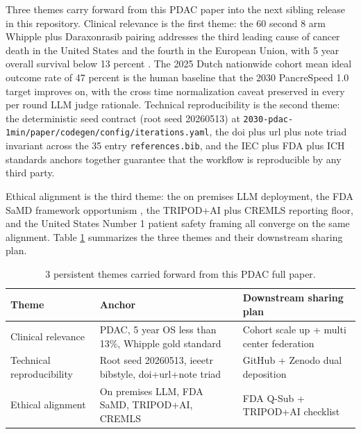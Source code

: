 Three themes carry forward from this PDAC paper into the next
sibling release in this repository. Clinical relevance is the
first theme: the 60 second 8 arm Whipple plus Daraxonrasib pairing
addresses the third leading cause of cancer death in the United
States and the fourth in the European Union, with 5 year overall
survival below 13 percent \cite{Siegel2025CancerStatistics}. The
2025 Dutch nationwide cohort mean ideal outcome rate of 47 percent
\cite{DutchCohort2025Whipple} is the human baseline that the 2030
PancreSpeed 1.0 target improves on, with the cross time
normalization caveat preserved in every per round LLM judge
rationale. Technical reproducibility is the second theme: the
deterministic seed contract (root seed 20260513) at
\texttt{2030-pdac-1min/paper/codegen/config/iterations.yaml}, the
doi plus url plus note triad invariant across the 35 entry
\texttt{references.bib}, and the IEC \cite{iec-80601-2-77,
iec-62304} plus FDA \cite{fda-samd, cfr-21-50-30, rev-fda-breakthrough}
plus ICH \cite{ich-e6r3} standards anchors together guarantee that
the workflow is reproducible by any third party.

Ethical alignment is the third theme: the on premises LLM
deployment, the FDA
SaMD framework opportunism \cite{fda-samd}, the TRIPOD+AI
\cite{Collins2024TRIPODAI} plus CREMLS \cite{ElEmam2024CREMLS}
reporting floor, and the United States Number 1 patient safety
framing all converge on the same alignment. Table
\ref{tab:conclusions-themes} summarizes the three themes and
their downstream sharing plan.

\clearpage

\begin{table}[H]
\caption{3 persistent themes carried forward from this PDAC full paper.}
\label{tab:conclusions-themes}
\centering
\begin{tabular}{>{\raggedright\arraybackslash}p{3.4cm} >{\raggedright\arraybackslash}p{5.5cm} >{\raggedright\arraybackslash}p{6.3cm}}
\toprule
\textbf{Theme} & \textbf{Anchor} & \textbf{Downstream sharing plan} \\
\midrule
  Clinical relevance & PDAC, 5 year OS less than 13\%, Whipple gold standard & Cohort scale up + multi center federation \\
  Technical reproducibility & Root seed 20260513, ieeetr bibstyle, doi+url+note triad & GitHub + Zenodo dual deposition \\
  Ethical alignment & On premises LLM, FDA SaMD, TRIPOD+AI, CREMLS & FDA Q-Sub + TRIPOD+AI checklist  \\
\bottomrule
\end{tabular}
\end{table}

